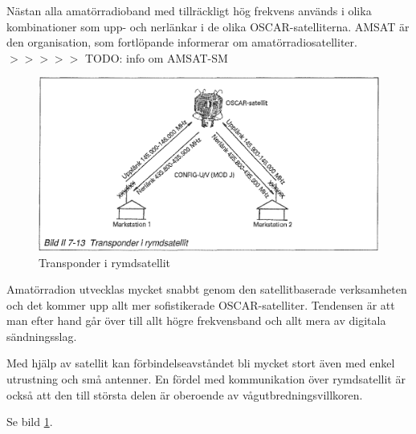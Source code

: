 Nästan alla amatörradioband med tillräckligt hög frekvens används i
olika kombinationer som upp- och nerlänkar i de olika
OSCAR-satelliterna.  AMSAT är den organisation, som fortlöpande
informerar om amatörradiosatelliter.
$>>>>>$ TODO: info om AMSAT-SM

\begin{figure}
  \includegraphics[width=\textwidth]{images/bild_2_7-13}
  \caption{Transponder i rymdsatellit}
  \label{fig:bildII7-13}
\end{figure}

Amatörradion utvecklas mycket snabbt genom den satellitbaserade
verksamheten och det kommer upp allt mer sofistikerade
OSCAR-satelliter. Tendensen är att man efter hand går över till allt
högre frekvensband och allt mera av digitala sändningsslag.

Med hjälp av satellit kan förbindelseavståndet bli mycket stort även
med enkel utrustning och små antenner. En fördel med kommunikation
över rymdsatellit är också att den till största delen är oberoende av
vågutbredningsvillkoren.

Se bild \ref{fig:bildII7-13}.
